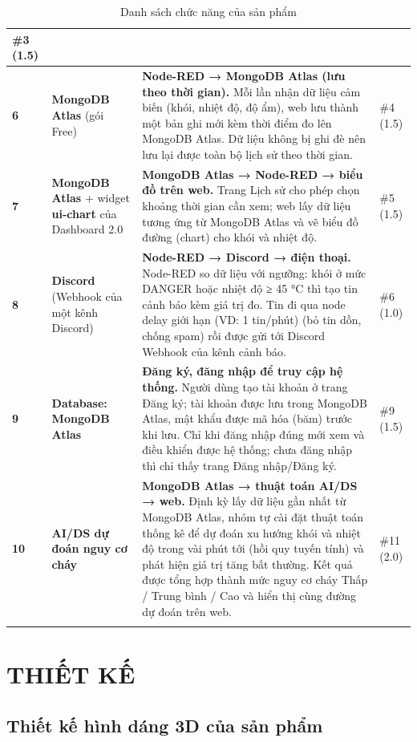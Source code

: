 \documentclass[12pt,a4paper]{article}
\begin{document}
{\begin{xltabular}{\textwidth}{|C{0.9cm}|L{3.3cm}|Y|C{2.1cm}|}
\#3 (1.5)\\ \hline
\textbf{6} & \textbf{MongoDB Atlas} (gói Free) &
\textbf{Node-RED → MongoDB Atlas (lưu theo thời gian).} Mỗi lần nhận dữ liệu cảm biến (khói, nhiệt độ, độ ẩm), web lưu thành một bản ghi mới kèm thời điểm đo lên MongoDB Atlas. Dữ liệu không bị ghi đè nên lưu lại được toàn bộ lịch sử theo thời gian. &
\#4 (1.5)\\ \hline
\textbf{7} & \textbf{MongoDB Atlas} + widget \textbf{ui-chart} của Dashboard 2.0 &
\textbf{MongoDB Atlas → Node-RED → biểu đồ trên web.} Trang Lịch sử cho phép chọn khoảng thời gian cần xem; web lấy dữ liệu tương ứng từ MongoDB Atlas và vẽ biểu đồ đường (chart) cho khói và nhiệt độ. &
\#5 (1.5)\\ \hline
\textbf{8} & \textbf{Discord }(Webhook của một kênh Discord) &
\textbf{Node-RED → Discord → điện thoại. }Node-RED so dữ liệu với ngưỡng: khói ở mức DANGER hoặc nhiệt độ ≥ 45 °C thì tạo tin cảnh báo kèm giá trị đo. Tin đi qua node delay giới hạn (VD: 1 tin/phút) (bỏ tin dồn, chống spam) rồi được gửi tới Discord Webhook của kênh cảnh báo. &
\#6 (1.0)\\ \hline
\textbf{9} & \textbf{Database: MongoDB Atlas} &
\textbf{Đăng ký, đăng nhập để truy cập hệ thống. }Người dùng tạo tài khoản ở trang Đăng ký; tài khoản được lưu trong MongoDB Atlas, mật khẩu được mã hóa (băm) trước khi lưu. Chỉ khi đăng nhập đúng mới xem và điều khiển được hệ thống; chưa đăng nhập thì chỉ thấy trang Đăng nhập/Đăng ký. &
\#9 (1.5)\\ \hline
\textbf{10} & \textbf{AI/DS dự đoán nguy cơ cháy} &
\textbf{MongoDB Atlas → thuật toán AI/DS → web. }Định kỳ lấy dữ liệu gần nhất từ MongoDB Atlas, nhóm tự cài đặt thuật toán thống kê để dự đoán xu hướng khói và nhiệt độ trong vài phút tới (hồi quy tuyến tính) và phát hiện giá trị tăng bất thường. Kết quả được tổng hợp thành mức nguy cơ cháy Thấp / Trung bình / Cao và hiển thị cùng đường dự đoán trên web. &
\#11 (2.0)\\ \hline
\caption{Danh sách chức năng của sản phẩm}\label{tab:chucnang}\\
\end{xltabular}
}

\section{THIẾT KẾ}

\subsection{Thiết kế hình dáng 3D của sản phẩm}
\end{document}

